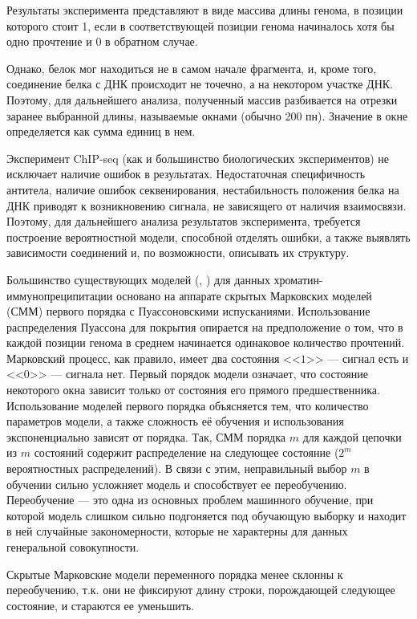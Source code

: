 \documentclass{matmex-diploma-custom}
\begin{document}
Результаты эксперимента представляют в виде массива длины генома, в позиции которого стоит 1, если в соответствующей позиции генома начиналось хотя бы одно прочтение
и 0 в обратном случае.

Однако, белок мог находиться не в самом начале фрагмента, и, кроме того, соединение белка с ДНК происходит не точечно, а на некотором участке ДНК.
Поэтому, для дальнейшего анализа, полученный массив разбивается на отрезки заранее выбранной длины, называемые окнами (обычно 200 пн). Значение в окне определяется как сумма единиц в нем. 

Эксперимент ChIP-seq (как и большинство биологических
экспериментов) не исключает наличие ошибок в результатах. Недостаточная специфичность антитела, наличие ошибок секвенирования, нестабильность положения белка на ДНК приводят к возникновению сигнала, не
зависящего от наличия взаимосвязи.
Поэтому, для дальнейшего анализа результатов эксперимента, требуется построение вероятностной модели, способной отделять ошибки, а также 
выявлять зависимости соединений и, по возможности, описывать их структуру.

Большинство существующих моделей (\cite{Zhang2008}, \cite{Spyrou2009}) для данных
хроматин-иммунопреципитации основано на аппарате скрытых Марковских моделей (СММ) \cite{Rabiner1989}
первого порядка с Пуассоновскими испусканиями. Использование распределения
Пуассона для покрытия опирается на предположение о том, что в каждой
позиции генома в среднем начинается одинаковое количество прочтений.
Марковский процесс, как правило, имеет два состояния <<$1$>> --- сигнал есть и <<$0$>> --- сигнала нет. Первый порядок модели означает, что состояние некоторого окна зависит только от состояния его прямого предшественника.
Использование моделей первого порядка объясняется тем, что количество параметров
модели, а также сложность её обучения и использования экспоненциально зависят от
порядка. Так, СММ порядка $ m $ для каждой цепочки из $ m $ состояний содержит распределение на следующее состояние ($ 2^m $ вероятностных распределений). В связи с этим, неправильный выбор $ m $ в обучении сильно усложняет модель и способствует ее переобучению. Переобучение --- это одна из основных проблем машинного обучение, при которой модель слишком сильно подгоняется под обучающую выборку и находит в ней случайные закономерности, которые не характерны для данных генеральной совокупности.

Скрытые Марковские модели переменного порядка менее склонны к переобучению, т.к. они не фиксируют длину строки, порождающей следующее состояние, и стараются ее уменьшить.
\end{document}
